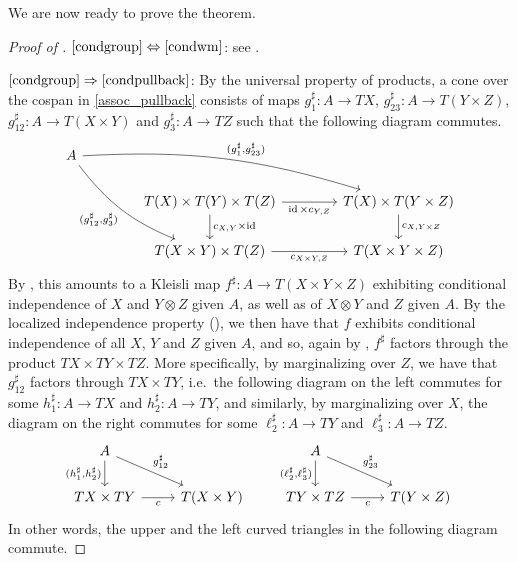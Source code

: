 \documentclass[a4paper,UKenglish,numberwithinsect,cleveref, autoref, thm-restate]{lipics-v2021}
\theoremstyle{plain} %
\theoremstyle{definition} %
\begin{document}
We are now ready to prove the theorem.

\begin{proof}[Proof of ]
 $\ref{condgroup}\Leftrightarrow\ref{condwm}$: 
 see .
 
 $\ref{condgroup}\Rightarrow\ref{condpullback}$: 
 By the universal property of products, a cone over the cospan in \eqref{assoc_pullback} consists of maps $g_1^\sharp:A\to TX$, $g_{23}^\sharp:A\to T(Y\times Z)$, $g_{12}^\sharp:A\to T(X\times Y)$ and $g_3^\sharp:A\to TZ$ such that the following diagram commutes. 
 \[
  \begin{tikzcd}[column sep=3.3pc]
   A \ar[bend left=10]{drr}{(g_1^\sharp,g_{23}^\sharp)} \ar[bend right=15]{ddr}[swap]{(g_{12}^\sharp,g_3^\sharp)} \\
   & T(X) \times T(Y) \times T(Z) \ar{r}[swap]{\id \times c_{Y,Z}} \ar{d}{c_{X,Y} \times \id}	& T(X) \times T(Y \times Z) \ar{d}{c_{X,Y \times Z}}	\\
   & T(X \times Y) \times T(Z) \ar{r}[swap]{c_{X\times Y,Z}}						& T(X \times Y \times Z)
  \end{tikzcd}
 \]
 By , this amounts to a Kleisli map $f^\sharp:A\to T(X\times Y\times Z)$ exhibiting conditional independence of $X$ and $Y\otimes Z$ given $A$, as well as of $X\otimes Y$ and $Z$ given $A$. By the localized independence property (), we then have that $f$ exhibits conditional independence of all $X$, $Y$ and $Z$ given $A$, and so, again by , $f^\sharp$ factors through the product $TX\times TY\times TZ$. 
 More specifically, by marginalizing over $Z$, we have that $g_{12}^\sharp$ factors through $TX\times TY$, i.e.~the following diagram on the left commutes for some $h_1^\sharp:A\to TX$ and $h_2^\sharp:A\to TY$, and similarly, by marginalizing over $X$, the diagram on the right commutes for some $\ell_2^\sharp:A\to TY$ and $\ell_3^\sharp:A\to TZ$.
 \[
  \begin{tikzcd}
   A \ar{d}[swap]{(h_1^\sharp,h_2^\sharp)} \ar{dr}{g_{12}^\sharp} \\
   TX\times TY \ar{r}[swap]{c} & T(X\times Y) 
  \end{tikzcd}
  \qquad
  \begin{tikzcd}
   A \ar{d}[swap]{(\ell_2^\sharp,\ell_3^\sharp)} \ar{dr}{g_{23}^\sharp} \\
   TY\times TZ \ar{r}[swap]{c} & T(Y\times Z) 
  \end{tikzcd}
 \]
 In other words, the upper and the left curved triangles in the following diagram commute.

\end{proof}
\end{document}
